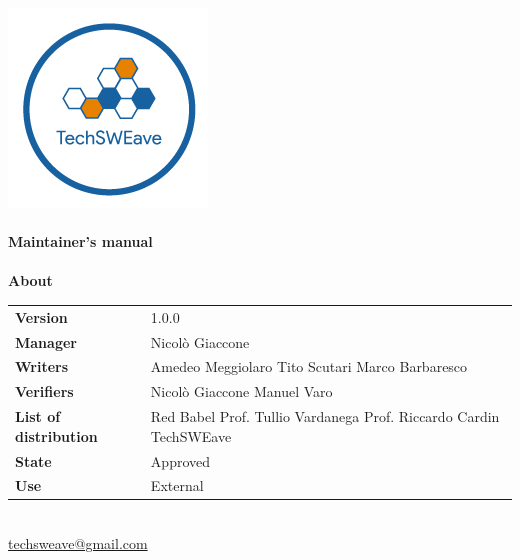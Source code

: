 \documentclass[a4paper]{article}
\begin{document}
\begin{titlepage}
    \begin{center}
        \includegraphics{../../../../Images/logo.png}\\
        \vspace{20px}
        \textcolor{logo}{\hrulefill}\\
        \vspace{20px}
        \textbf{\huge\textcolor{logo}{Maintainer's manual}}\\
        \vspace{10px}
        \textcolor{logo}{\hrulefill}\\
        \vspace{40px}
        \textbf{\Large About}\\
        \vspace{20px}
        \begin{tabular}{p{100px} | p{100px}}
            \textbf{Version}              & 1.0.0                                                                                        \\
            \textbf{Manager}              & Nicolò Giaccone                                                                                 \\
            \textbf{Writers}              & Amedeo Meggiolaro \newline Tito Scutari \newline Marco Barbaresco                            \\
            \textbf{Verifiers}            & Nicolò Giaccone \newline Manuel Varo                                                         \\
            \textbf{List of distribution} & Red Babel \newline Prof. Tullio Vardanega \newline Prof. Riccardo Cardin \newline TechSWEave \\
            \textbf{State}                & Approved                                                                                   \\
            \textbf{Use}                  & External                                                                                      \\
        \end{tabular}\\
        \vspace{60px}
        \href{mailto:techsweave@gmail.com}{techsweave@gmail.com}\\


\end{center}
\end{titlepage}
\end{document}

